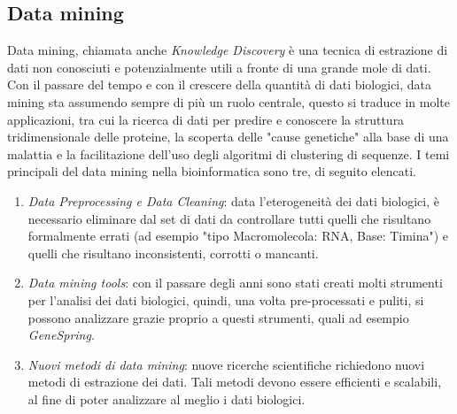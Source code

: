 \subsection{Data mining}
Data mining, chiamata anche \textit{Knowledge Discovery} è una tecnica di estrazione di dati non conosciuti e potenzialmente utili a fronte di una grande mole di dati. Con il passare del tempo e con il crescere della quantità di dati biologici, data mining sta assumendo sempre di più un ruolo centrale, questo si traduce in molte applicazioni, tra cui la ricerca di dati per predire e conoscere la struttura tridimensionale delle proteine, la scoperta delle "cause genetiche" alla base di una malattia e la facilitazione dell'uso degli algoritmi di clustering di sequenze.
\newline
I temi principali del data mining nella bioinformatica sono tre, di seguito elencati.
\begin{enumerate}
	\item \textit{Data Preprocessing e Data Cleaning}: data l'eterogeneità dei dati biologici, è necessario eliminare dal set di dati da controllare tutti quelli che risultano formalmente errati (ad esempio "tipo Macromolecola: RNA, Base: Timina") e quelli che risultano inconsistenti, corrotti o mancanti.
	\item \textit{Data mining tools}: con il passare degli anni sono stati creati molti strumenti per l'analisi dei dati biologici, quindi, una volta pre-processati e puliti, si possono analizzare grazie proprio a questi strumenti, quali ad esempio \textit{GeneSpring}.
	\item \textit{Nuovi metodi di data mining}: nuove ricerche scientifiche richiedono nuovi metodi di estrazione dei dati. Tali metodi devono essere efficienti e scalabili, al fine di poter analizzare al meglio i dati biologici.
\end{enumerate}

